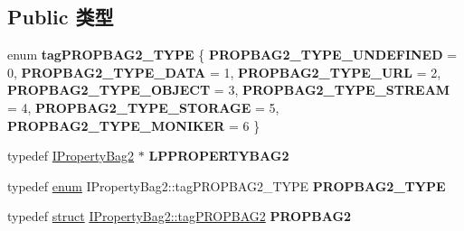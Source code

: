 \subsection*{Public 类型}
\begin{DoxyCompactItemize}
\item 
\mbox{\label{interface_i_property_bag2_a59617c12b8776f7c0a7dc45e91d74afd}} 
enum {\bfseries tag\+P\+R\+O\+P\+B\+A\+G2\+\_\+\+T\+Y\+PE} \{ \newline
{\bfseries P\+R\+O\+P\+B\+A\+G2\+\_\+\+T\+Y\+P\+E\+\_\+\+U\+N\+D\+E\+F\+I\+N\+ED} = 0, 
{\bfseries P\+R\+O\+P\+B\+A\+G2\+\_\+\+T\+Y\+P\+E\+\_\+\+D\+A\+TA} = 1, 
{\bfseries P\+R\+O\+P\+B\+A\+G2\+\_\+\+T\+Y\+P\+E\+\_\+\+U\+RL} = 2, 
{\bfseries P\+R\+O\+P\+B\+A\+G2\+\_\+\+T\+Y\+P\+E\+\_\+\+O\+B\+J\+E\+CT} = 3, 
\newline
{\bfseries P\+R\+O\+P\+B\+A\+G2\+\_\+\+T\+Y\+P\+E\+\_\+\+S\+T\+R\+E\+AM} = 4, 
{\bfseries P\+R\+O\+P\+B\+A\+G2\+\_\+\+T\+Y\+P\+E\+\_\+\+S\+T\+O\+R\+A\+GE} = 5, 
{\bfseries P\+R\+O\+P\+B\+A\+G2\+\_\+\+T\+Y\+P\+E\+\_\+\+M\+O\+N\+I\+K\+ER} = 6
 \}
\item 
\mbox{\label{interface_i_property_bag2_a0fc307d312bf0213a3a427646a0de39b}} 
typedef \hyperlink{interface_i_property_bag2}{I\+Property\+Bag2} $\ast$ {\bfseries L\+P\+P\+R\+O\+P\+E\+R\+T\+Y\+B\+A\+G2}
\item 
\mbox{\label{interface_i_property_bag2_ad58eda5fb2f912dac3c87cfc45285919}} 
typedef \hyperlink{interfaceenum}{enum} I\+Property\+Bag2\+::tag\+P\+R\+O\+P\+B\+A\+G2\+\_\+\+T\+Y\+PE {\bfseries P\+R\+O\+P\+B\+A\+G2\+\_\+\+T\+Y\+PE}
\item 
\mbox{\label{interface_i_property_bag2_ac49d964d7604a6012bafb24a2d2cd9f6}} 
typedef \hyperlink{interfacestruct}{struct} \hyperlink{struct_i_property_bag2_1_1tag_p_r_o_p_b_a_g2}{I\+Property\+Bag2\+::tag\+P\+R\+O\+P\+B\+A\+G2} {\bfseries P\+R\+O\+P\+B\+A\+G2}
\end{DoxyCompactItemize}
